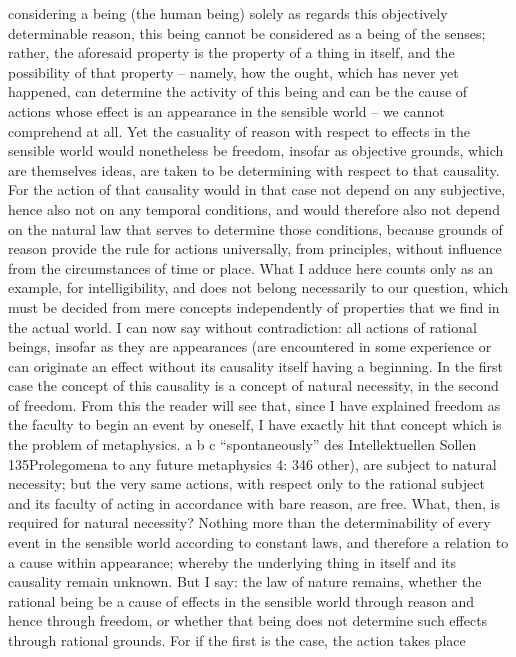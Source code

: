 considering a being (the human being) solely as regards this objectively
determinable reason, this being cannot be considered as a being of the
senses; rather, the aforesaid property is the property of a thing in itself,
and the possibility of that property – namely, how the ought, which has
never yet happened, can determine the activity of this being and can be
the cause of actions whose effect is an appearance in the sensible world –
we cannot comprehend at all. Yet the casuality of reason with respect to
effects in the sensible world would nonetheless be freedom, insofar as
objective grounds, which are themselves ideas, are taken to be determining
with respect to that causality. For the action of that causality would in
that case not depend on any subjective, hence also not on any temporal
conditions, and would therefore also not depend on the natural law that
serves to determine those conditions, because grounds of reason provide
the rule for actions universally, from principles, without inﬂuence from
the circumstances of time or place.
What I adduce here counts only as an example, for intelligibility, and
does not belong necessarily to our question, which must be decided from
mere concepts independently of properties that we ﬁnd in the actual
world.
I can now say without contradiction: all actions of rational beings,
insofar as they are appearances (are encountered in some experience or
can originate an effect without its causality itself having a beginning. In the ﬁrst
case the concept of this causality is a concept of natural necessity, in the second
of freedom. From this the reader will see that, since I have explained freedom
as the faculty to begin an event by oneself, I have exactly hit that concept which
is the problem of metaphysics.
a
b
c
“spontaneously”
des Intellektuellen
Sollen
135Prolegomena to any future metaphysics
4: 346
other), are subject to natural necessity; but the very same actions, with
respect only to the rational subject and its faculty of acting in accordance
with bare reason, are free. What, then, is required for natural necessity?
Nothing more than the determinability of every event in the sensible
world according to constant laws, and therefore a relation to a cause
within appearance; whereby the underlying thing in itself and its causality
remain unknown. But I say: the law of nature remains, whether the rational
being be a cause of effects in the sensible world through reason and hence
through freedom, or whether that being does not determine such effects
through rational grounds. For if the ﬁrst is the case, the action takes place
